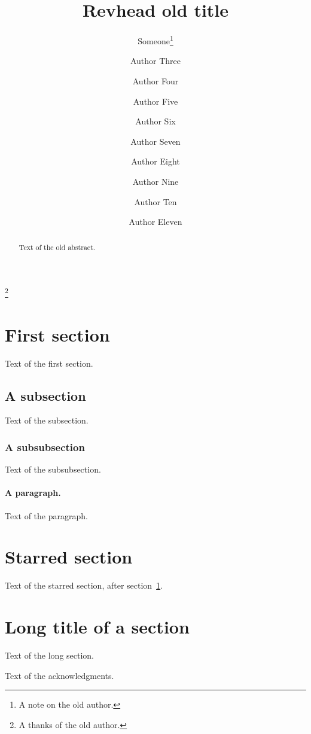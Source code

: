 \documentclass{revtex4-1}
\begin{document}
\title{Revhead old title}
\author{Someone\footnote{A note on the old author.}}
\thanks{A thanks of the old author.}
\author{Author Three}
\author{Author Four}
\author{Author Five}
\author{Author Six}
\author{Author Seven}
\author{Author Eight}
\author{Author Nine}
\author{Author Ten}
\author{Author Eleven}
\begin{abstract}
Text of the old abstract.
\end{abstract}
\maketitle
\section{First section}\label{sec:first}
Text of the first section.
\subsection{A subsection}
Text of the subsection.
\subsubsection{A subsubsection}
Text of the subsubsection.
\paragraph{A paragraph.}
Text of the paragraph.
\section*{Starred section}
Text of the starred section, after section~\ref{sec:first}.
\section[Short]{Long title of a section}
Text of the long section.
\begin{acknowledgments}
Text of the acknowledgments.
\end{acknowledgments}
\end{document}
